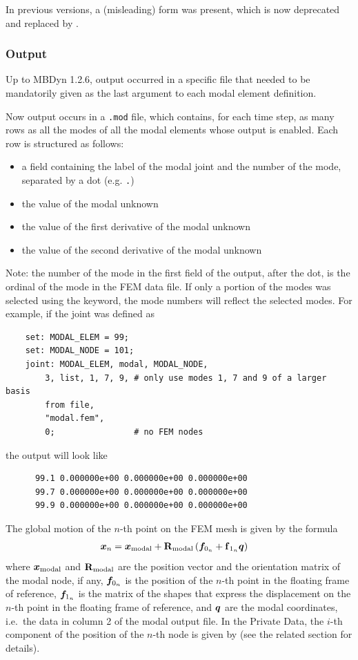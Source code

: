 In previous versions, a (misleading)  form
was present, which is now deprecated and replaced by .



\subsubsection{Output}
Up to MBDyn 1.2.6, output occurred in a specific file that needed
to be mandatorily given as the last argument to each modal element
definition.

Now output occurs in a \texttt{.mod} file, which contains, for each time step,
as many rows as all the modes of all the modal elements whose output is enabled.
Each row is structured as follows:
\begin{itemize}
\item a field containing the label of the modal joint and the number of the mode,
separated by a dot (e.g. \texttt{.})
\item the value of the modal unknown
\item the value of the first derivative of the modal unknown
\item the value of the second derivative of the modal unknown
\end{itemize}
Note: the number of the mode in the first field of the output, after the dot,
is the ordinal of the mode in the FEM data file.
If only a portion of the modes was selected using the  keyword,
the mode numbers will reflect the selected modes.
For example, if the  joint was defined as
\begin{verbatim}
    set: MODAL_ELEM = 99;
    set: MODAL_NODE = 101;
    joint: MODAL_ELEM, modal, MODAL_NODE,
        3, list, 1, 7, 9, # only use modes 1, 7 and 9 of a larger basis
        from file,
        "modal.fem",
        0;                # no FEM nodes
\end{verbatim}
the output will look like
\begin{verbatim}
      99.1 0.000000e+00 0.000000e+00 0.000000e+00
      99.7 0.000000e+00 0.000000e+00 0.000000e+00
      99.9 0.000000e+00 0.000000e+00 0.000000e+00
\end{verbatim}
The global motion of the $n$-th point on the FEM mesh is given by the formula
\begin{align}
	\boldsymbol{x}_n
	&=
	\boldsymbol{x}_\text{modal}
	+
	\bm{\mathbf R}_\text{modal} \left( 
		\boldsymbol{f}_{0_n}
		+
		\bm{\mathbf f}_{1_n} \boldsymbol{q}
	 \right)
\end{align}
where $\boldsymbol{x}_\text{modal}$ and $\bm{\mathbf R}_\text{modal}$
are the position vector and the orientation matrix of the modal node, if any,
$\boldsymbol{f}_{0_n}$ is the position of the $n$-th point in the floating frame of reference,
$\boldsymbol{f}_{1_n}$ is the matrix of the shapes that express the displacement on the $n$-th point
in the floating frame of reference, and $\boldsymbol{q}$ are the modal coordinates,
i.e.\ the data in column 2 of the modal output file.
In the Private Data, the $i$-th component of the position of the $n$-th node
is given by  (see the related section for details).



